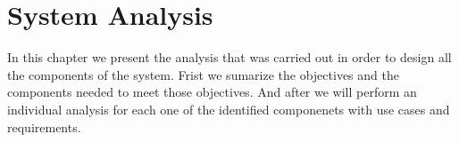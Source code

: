 \setchapterpreamble[u]{\margintoc}
\chapter{System Analysis}

In this chapter we present the analysis that was carried out in order to design all the components of the system.
Frist we sumarize the objectives and the components needed to meet those objectives. And after we will perform an
individual analysis for each one of the identified componenets with use cases and requirements.









%

%

%

%